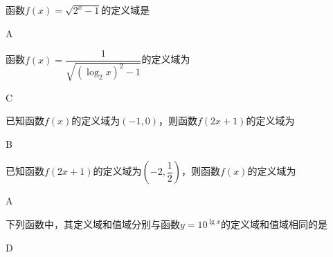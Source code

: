   \begin{exercise}
    \item
      函数$f(x)=\sqrt{2^x-1}$的定义域是\xz
      \begin{answer}
        A
      \end{answer}
    \item
      函数$f(x)=\dfrac{1}{\sqrt{\left(\log_2x\right)^2-1}}$的定义域为\xz
      \xx{$ \left(0,\dfrac{1}{2}\right)$}{$ \left(2,+\infty\right)$}{$ \left(0,\dfrac{1}{2}\right)\bigcup\left(2,+\infty\right)$}{$ \left(0,\dfrac{1}{2}\right]\bigcup\left[2,+\infty\right)$}
      \begin{answer}
        C
      \end{answer}
    \item
      已知函数$f(x)$的定义域为$(-1,0)$，则函数$f(2x+1)$的定义域为\xz
      \begin{answer}
        B
      \end{answer}
    \item
      已知函数$f(2x+1)$的定义域为$\left(-2,\dfrac{1}{2}\right)$，则函数$f(x)$的定义域为\xz
      \begin{answer}
        A
      \end{answer}
    \item
      下列函数中，其定义域和值域分别与函数$y=10^{\lg x}$的定义域和值域相同的是\xz
      \begin{answer}
        D
      \end{answer}
  \end{exercise}
